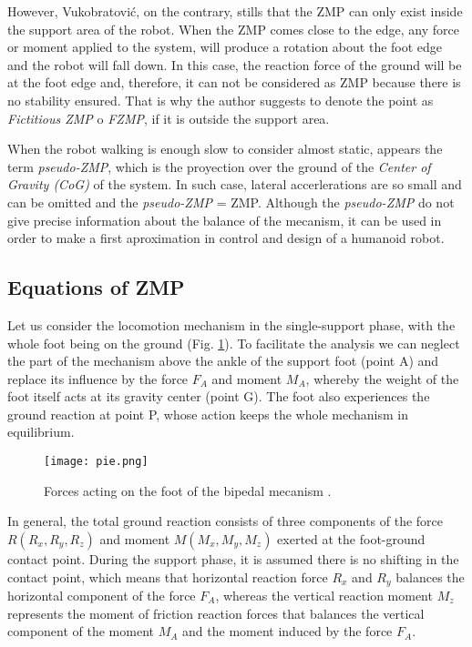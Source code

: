 However, Vukobratović, on the contrary, stills that the ZMP can only exist inside the support area of the robot. When the ZMP comes close to the edge, any force or moment applied to the system, will produce a rotation about the foot edge and the robot will fall down. In this case, the reaction force of the ground will be at the foot edge and, therefore, it can not be considered as ZMP because there is no stability ensured. That is why the author suggests to denote the point as \textit{Fictitious ZMP} o \textit{FZMP}, if it is outside the support area. 
 
When the robot walking is enough slow to consider almost static, appears the term \textit{pseudo-ZMP}, which is the proyection over the ground of the \textit{Center of Gravity (CoG)} of the system. In such case, lateral accerlerations are so small and can be omitted and the \textit{pseudo-ZMP} = ZMP. Although the \textit{pseudo-ZMP} do not give precise information about the balance of the mecanism, it can be used in order to make a first aproximation in control and design of a humanoid robot.



\subsection{Equations of ZMP}
Let us consider the locomotion mechanism in the single-support phase, with the whole foot being on the ground (Fig. \ref{fig:pie}). To facilitate the analysis we can neglect the part of the mechanism above the ankle of the support foot (point A) and replace its influence by the force $F_A$ and moment $M_A$, whereby the weight of the foot itself acts at its gravity center (point G). The foot also experiences the ground reaction at point P, whose action keeps the whole mechanism in equilibrium.

\begin{figure}[!hbt]
\centering
\texttt{[image: pie.png]}
\caption{Forces acting on the foot of the bipedal mecanism \cite{Vuk_2004}.}
\label{fig:pie}
\end{figure}

In general, the total ground reaction consists of three components of the force $R (R_x, R_y, R_z)$ and moment $M (M_x, M_y, M_z)$ exerted at the foot-ground contact point. During the support phase, it is assumed there is no shifting in the contact point, which means that horizontal reaction force $R_x$ and $R_y$ balances the horizontal component of the force $F_A$, whereas the vertical reaction moment $M_z$ represents the moment of friction reaction forces that balances the vertical component of the moment $M_A$ and the moment induced by the force $F_A$.

